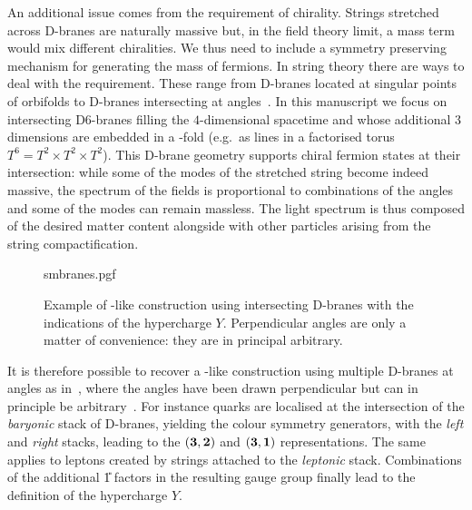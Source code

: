 An additional issue comes from the requirement of chirality.
Strings stretched across D-branes are naturally massive but, in the field theory limit, a mass term would mix different chiralities.
We thus need to include a symmetry preserving mechanism for generating the mass of fermions.
In string theory there are ways to deal with the requirement.
These range from D-branes located at singular points of orbifolds to D-branes intersecting at angles~\cite{Uranga:2003:ChiralFourdimensionalString,Aldazabal:2000:DBranesSingularitiesBottomUp,Zwiebach:2009:FirstCourseString}.
In this manuscript we focus on intersecting D6-branes filling the $4$-dimensional spacetime and whose additional $3$ dimensions are embedded in a -fold (e.g.\ as lines in a factorised torus $T^6 = T^2 \times T^2 \times T^2$).
This D-brane geometry supports chiral fermion states at their intersection: while some of the modes of the stretched string become indeed massive, the spectrum of the fields is proportional to combinations of the angles and some of the modes can remain massless.
The light spectrum is thus composed of the desired matter content alongside with other particles arising from the string compactification.

\begin{figure}[tbp]
  \centering
  {smbranes.pgf}
  \caption{%
    Example of \sm-like construction using intersecting D-branes with the indications of the hypercharge $Y$.
    Perpendicular angles are only a matter of convenience: they are in principal arbitrary.
  }
  \label{fig:dbranes:smbranes}
\end{figure}

It is therefore possible to recover a \sm-like construction using multiple D-branes at angles as in~, where the angles have been drawn perpendicular but can in principle be arbitrary~\cite{Ibanez:2001:GettingJustStandard,Sheikh-Jabbari:1998:ClassificationDifferentBranes,Berkooz:1996:BranesIntersectingAngles}.
For instance quarks are localised at the intersection of the \emph{baryonic} stack of D-branes, yielding the colour symmetry generators, with the \emph{left} and \emph{right} stacks, leading to the $\qty( \vb{3}, \vb{2} )$ and $\qty( \vb{3}, \vb{1})$ representations.
The same applies to leptons created by strings attached to the \emph{leptonic} stack.
Combinations of the additional \U{1} factors in the resulting gauge group finally lead to the definition of the hypercharge $Y$.

